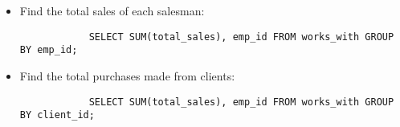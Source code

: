 \begin{itemize}
    \item Find the total sales of each salesman:
        \begin{verbatim}
            SELECT SUM(total_sales), emp_id FROM works_with GROUP BY emp_id;
        \end{verbatim}
    
    \item Find the total purchases made from clients:
        \begin{verbatim}
            SELECT SUM(total_sales), emp_id FROM works_with GROUP BY client_id;
        \end{verbatim}
\end{itemize}
